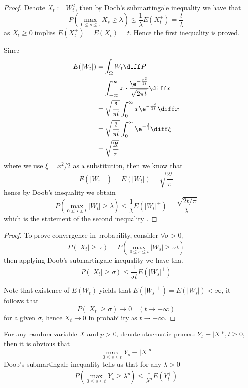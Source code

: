     \problem
    \begin{proof}
        Denote $X_t:=W_t^2$, then by Doob's submartingale inequality
        we have that
        \[P\left(\max_{0\leq s\leq t}X_s\geq\lambda\right)
        \leq\frac{1}{\lambda}E(X_t^+)=\frac{t}{\lambda}\]
        as $X_t\geq 0$ implies $E(X_t^+)=E(X_t)=t$. Hence the
        first inequality is proved.

        Since
        \[\begin{aligned}
            E(|W_t|)&=\int_{\Omega}W_t\diff P\\
            &=\int_{-\infty}^\infty x\cdot
              \frac{\e^{-\frac{x^2}{2t}}}{\sqrt{2\pi t}}
              \diff x\\
            &=\sqrt{\frac{2}{\pi t}}\int_0^\infty x\e^{-\frac{x^2}{2t}}\diff x\\
            &=\sqrt{\frac{2}{\pi t}}\int_0^\infty \e^{-\frac{\xi}{t}}\diff\xi\\
            &=\sqrt{\frac{2t}{\pi}}
        \end{aligned}\]
        where we use $\xi=x^2/2$ as a substitution,
        then we know that
        \[E(|W_t|^+)=E(|W_t|)=\sqrt{\frac{2t}{\pi}}\]
        hence by Doob's inequality we obtain
        \[P\left(\max_{0\leq s\leq t}|W_t|\geq\lambda\right)
        \leq\frac{1}{\lambda}E(|W_t|^+)=\frac{\sqrt{2t/\pi}}{\lambda}\]
        which is the statement of the second inequality
        .
    \end{proof}

    \problem
    \begin{proof}
        To prove convergence in probability, consider
        $\forall\sigma>0$,
        \[P(|X_t|\geq\sigma)
        =P\left(\max_{0\leq s\leq t}|W_s|\geq\sigma t\right)\]
        then applying Doob's submartingale inequality we have that
        \[P(|X_t|\geq\sigma)\leq\frac{1}{\sigma t}E(|W_s|^+)\]

        Note that existence of $E(W_t)$ yields that
        $E(|W_s|^+)=E(|W_s|)<\infty$, it follows that
        \[P(|X_t|\geq\sigma)\to 0\quad (t\to +\infty)\]
        for a given $\sigma$, hence $X_t\to 0$ in probability
        as $t\to +\infty$.
    \end{proof}

    \problem
    For any random variable $X$ and $p>0$, denote stochastic process
    $Y_t=|X|^p,t\geq 0$,
    then it is obvious that
    \[\max_{0\leq s\leq t}Y_s=|X|^p\]
    Doob's submartingale inequality tells us that
    for any $\lambda>0$
    \[P\left(\max_{0\leq s\leq t}Y_s\geq\lambda^p\right)
    \leq\frac{1}{\lambda^p}E(Y_t^+)\]

